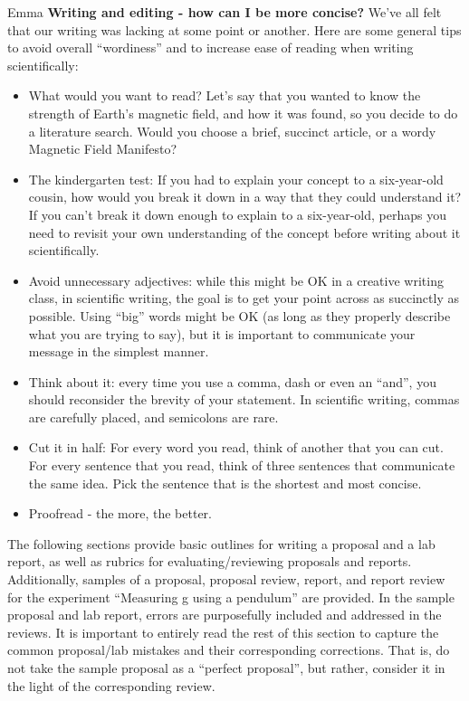 \newpage
\begin{studentOpinion}{Emma}
\textbf{Writing and editing - how can I be more concise?}
We've all felt that our writing was lacking at some point or another. Here are some general tips to avoid overall ``wordiness'' and to increase ease of reading when writing scientifically: 
\begin{itemize}
\item What would you want to read? Let's say that you wanted to know the strength of Earth's magnetic field, and how it was found, so you decide to do a literature search. Would you choose a brief, succinct article, or a wordy Magnetic Field Manifesto?
\item The kindergarten test: If you had to explain your concept to a six-year-old cousin, how would you break it down in a way that they could understand it? If you can't break it down enough to explain to a six-year-old, perhaps you need to revisit your own understanding of the concept before writing about it scientifically.
\item Avoid unnecessary adjectives: while this might be OK in a creative writing class, in scientific writing, the goal is to get your point across as succinctly as possible. Using ``big'' words might be OK (as long as they properly describe what you are trying to say), but it is important to communicate your message in the simplest manner. 
\item Think about it: every time you use a comma, dash or even an ``and'', you should reconsider the brevity of your statement. In scientific writing, commas are carefully placed, and semicolons are rare. 
\item Cut it in half: For every word you read, think of another that you can cut. For every sentence that you read, think of three sentences that communicate the same idea. Pick the sentence that is the shortest and most concise. 
\item Proofread - the more, the better.
\end{itemize}
\end{studentOpinion}

The following sections provide basic outlines for writing a proposal and a lab report, as well as rubrics for evaluating/reviewing proposals and reports. Additionally, samples of a proposal, proposal review, report, and report review for the experiment ``Measuring g using a pendulum'' are provided. In the sample proposal and lab report, errors are purposefully included and addressed in the reviews. It is important to entirely read the rest of this section to capture the common proposal/lab mistakes and their corresponding corrections. That is, do not take the sample proposal as a ``perfect proposal'', but rather, consider it in the light of the corresponding review.
\newpage


